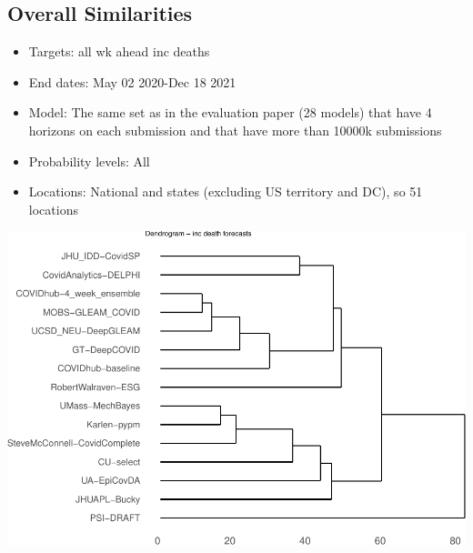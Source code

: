 \documentclass[
]{article}
\providecommand{\tightlist}{%
  \setlength{\itemsep}{0pt}\setlength{\parskip}{0pt}}
\begin{document}
\hypertarget{overall-similarities}{%
\subsection{Overall Similarities}\label{overall-similarities}}

\begin{itemize}
\tightlist
\item
  Targets: all wk ahead inc deaths
\item
  End dates: May 02 2020-Dec 18 2021
\item
  Model: The same set as in the evaluation paper (28 models) that have 4
  horizons on each submission and that have more than 10000k submissions
\item
  Probability levels: All
\item
  Locations: National and states (excluding US territory and DC), so 51
  locations
\end{itemize}

\includegraphics{sim_analysis_4_files/figure-latex/dendro-1.pdf}
\end{document}
